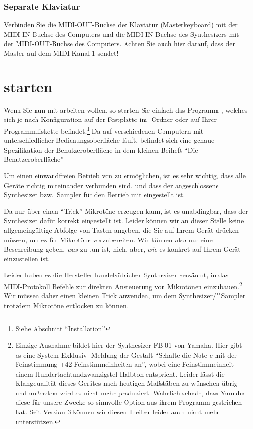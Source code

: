 \subsection{Separate Klaviatur}\label{sec:separate-klaviatur}

Verbinden Sie die MIDI-OUT-Buchse der Klaviatur (Masterkeyboard)
mit der MIDI-IN-Buchse des Computers und die MIDI-IN-Buchse
des Synthesizers mit der MIDI-OUT-Buchse des Computers. Achten Sie
auch hier darauf, dass der Master auf dem MIDI-Kanal 1 sendet!


\chapter{\mutabor{} starten}\label{cha:mutabor-starten}


 Wenn Sie nun mit \mutabor{}
arbeiten wollen, so starten Sie einfach das Programm ,
welches sich je nach Konfiguration auf der Festplatte im
\mutabor{}-Ordner oder auf Ihrer Programmdiskette
befindet.\footnote{Siehe Abschnitt "`Installation"'} Da \mutabor{} auf
verschiedenen Computern mit unterschiedlicher Bedienungsoberfläche
läuft, befindet sich eine genaue Spezifikation der Benutzeroberfläche
in dem kleinen Beiheft "`Die Benutzeroberfläche"'

Um einen einwandfreien Betrieb von \mutabor{} zu ermöglichen, ist es
sehr wichtig, dass alle Geräte richtig miteinander verbunden sind, und
dass der angeschlossene Synthesizer bzw.\ Sampler für den Betrieb mit
\mutabor{} eingestellt ist.

Da \mutabor{} nur über einen "`Trick"' 
Mikrotöne erzeugen kann, ist es unabdingbar, dass der Synthesizer dafür
korrekt eingestellt ist. Leider können wir an dieser Stelle keine
allgemeingültige Abfolge von Tasten angeben, die Sie auf Ihrem Gerät
drücken müssen, um es für Mikrotöne vorzubereiten. Wir können also nur
eine Beschreibung geben, \emph{was} zu tun ist, nicht aber, \emph{wie}
es konkret auf Ihrem Gerät einzustellen ist. 


Leider haben es die Hersteller handelsüblicher Synthesizer versäumt,
in das MIDI-Protokoll Befehle zur direkten Ansteuerung von Mikrotönen
einzubauen.\footnote{Einzige Ausnahme bildet hier der
Synthesizer FB-01 von Yamaha. Hier gibt es eine System-Exklusiv-
Meldung der Gestalt "`Schalte die Note c mit der Feinstimmung +42
Feinstimmeinheiten an"', wobei eine Feinstimmeinheit einem
Hundertachtundzwanzigstel Halbton entspricht. Leider lässt die
Klangqualität dieses Gerätes nach heutigen Maßstäben zu wünschen übrig
und außerdem wird es nicht mehr produziert. Wahrlich schade, dass
Yamaha diese für unsere Zwecke so sinnvolle Option aus ihrem Programm
gestrichen hat. \iffalse
Trotzdem haben wir einen speziellen Treiber für dieses
Gerät geschrieben, denn es erreicht von allen uns bekannten
Synthesizern noch immer die beste Intonationsgenauigkeit.
\fi
Seit Version 3 können wir diesen Treiber leider auch nicht mehr unterstützen.} Wir müssen
daher einen kleinen Trick anwenden, um dem Synthesizer/""Sampler
trotzdem Mikrotöne entlocken zu können.

